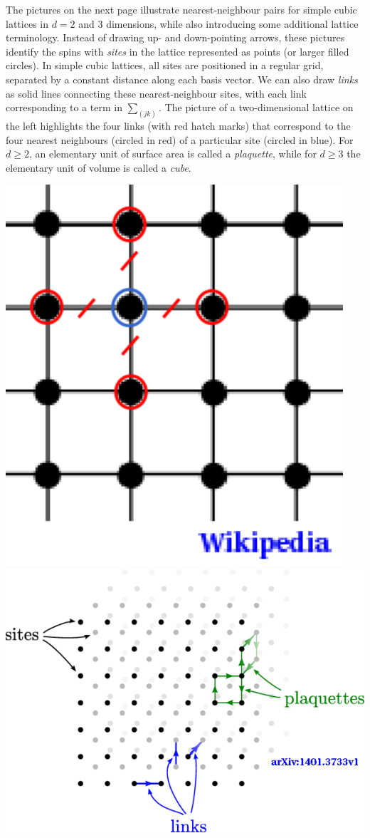 The pictures on the next page illustrate nearest-neighbour pairs for simple cubic lattices in $d = 2$ and $3$ dimensions, while also introducing some additional lattice terminology.
Instead of drawing up- and down-pointing arrows, these pictures identify the spins with \textit{sites} in the lattice represented as points (or larger filled circles).
In simple cubic lattices, all sites are positioned in a regular grid, separated by a constant distance along each basis vector.
We can also draw \textit{links} as solid lines connecting these nearest-neighbour sites, with each link corresponding to a term in $\sum_{(jk)}$.
The picture of a two-dimensional lattice on the left highlights the four links (with red hatch marks) that correspond to the four nearest neighbours (circled in red) of a particular site (circled in blue).
For $d \geq 2$, an elementary unit of surface area is called a \textit{plaquette}, while for $d \geq 3$ the elementary unit of volume is called a \textit{cube}.

\begin{center}
  \includegraphics[height=0.4\textwidth]{figs/unit09_lattice_2d.pdf}\hfill
  \includegraphics[height=0.4\textwidth]{figs/unit09_lattice_3d.pdf}
\end{center}

